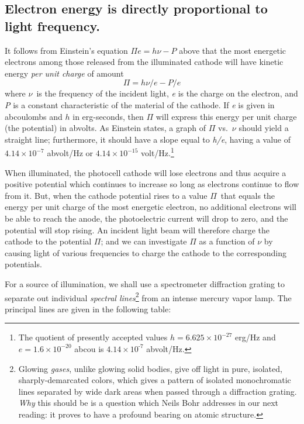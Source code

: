 \subsection{Electron energy is directly proportional to light frequency.}

It follows from Einstein's equation $\Pi e = h\nu - P$
above that the most energetic electrons among those released from the
illuminated cathode will have kinetic energy \emph{per unit charge} of
amount
\begin{equation*}
\Pi = h\nu/e - P/e
\end{equation*}
where $\nu$~is the frequency of the incident light, \emph{e} is the
charge on the electron, and \emph{P} is a constant characteristic of the
material of the cathode. If \emph{e} is given in abcoulombs and $h$
in erg-seconds, then $\Pi$ will express this energy per unit charge
(the potential) in abvolts. As Einstein states, a
graph of $\Pi$ vs.\ $\nu$ should yield a straight line;
furthermore, it should have a slope equal to \emph{h/e}, having a value
of $4.14\times 10^{-7}$ abvolt/Hz or $4.14\times 10^{-15}$ volt/Hz.\footnote{The
  quotient of presently accepted values $h = 6.625\times 10^{-27}$ erg/Hz
  and $e = 1.6\times 10^{-20}$ abcou is $4.14\times 10^{‑7}$ abvolt/Hz.}

When illuminated, the photocell cathode will lose electrons and thus
acquire a positive potential which continues to increase so long as
electrons continue to flow from it. But, when the cathode potential
rises to a value $\Pi$~that equals the energy per unit charge of the
most energetic electron, no additional electrons will be able to reach
the anode, the photoelectric current will drop to zero, and the
potential will stop rising. An incident light beam will therefore charge
the cathode to the potential $\Pi$; and we can
investigate $\Pi$ as a function of $\nu$ by causing light of
various frequencies to charge the cathode to the corresponding
potentials.

For a source of illumination, we shall use a spectrometer diffraction
grating to separate out individual \emph{spectral lines}\footnote{Glowing
  \emph{gases}, unlike glowing solid bodies, give off light in pure,
  isolated, sharply-demarcated colors, which gives a pattern of isolated
  monochromatic lines separated by wide dark areas when passed through a
  diffraction grating. \emph{Why} this should be is a question which
  Neils Bohr addresses in our next reading: it proves to have a profound
  bearing on atomic structure.} from an intense mercury vapor lamp. The
principal lines are given in the following table:


